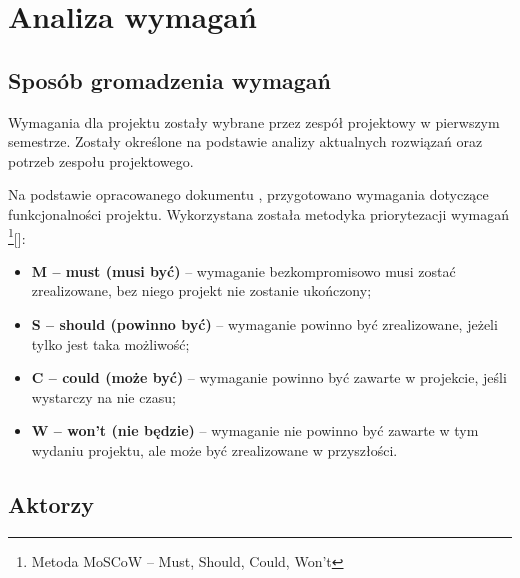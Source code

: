 \newgeometry{} %

\chapter{Analiza wymagań}
\label{ch:analiza-wymagan}

\section{Sposób gromadzenia wymagań}
\label{sec:sposob-gromadzenia-wymagan}

Wymagania dla projektu zostały wybrane przez zespół projektowy w pierwszym semestrze. Zostały określone na podstawie analizy aktualnych rozwiązań oraz potrzeb zespołu projektowego.

Na podstawie opracowanego dokumentu , przygotowano wymagania dotyczące funkcjonalności projektu. \newline Wykorzystana została metodyka priorytezacji wymagań \footnote{Metoda MoSCoW – Must, Should, Could, Won't}[]:
\begin{itemize}
    \item \textbf{M – must (musi być)} – wymaganie bezkompromisowo musi zostać zrealizowane, bez niego projekt nie zostanie ukończony;
    \item \textbf{S – should (powinno być)} – wymaganie powinno być zrealizowane, jeżeli tylko jest taka możliwość;
    \item \textbf{C – could (może być)} – wymaganie powinno być zawarte w projekcie, jeśli wystarczy na nie czasu;
    \item \textbf{W – won't (nie będzie)} – wymaganie nie powinno być zawarte w tym wydaniu projektu, ale może być zrealizowane w przyszłości.
\end{itemize}


\section{Aktorzy}
\label{sec:aktorzy}

\begin{stakeholder}[label={tab:stakeholder:someholder1},caption={opis udzialowca}]
    \requ{-----------------}
\end{stakeholder}

